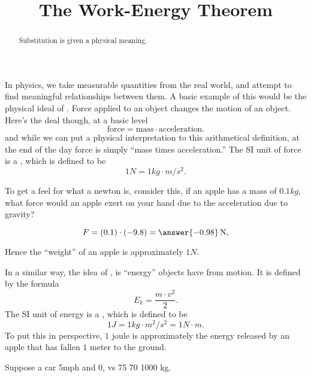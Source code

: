 \documentclass{ximera}
\title[Dig-In:]{The Work-Energy Theorem}
\begin{document}
\begin{abstract}
  Substitution is given a physical meaning. 
\end{abstract}
\maketitle

In physics, we take measurable quantities from the real world, and
attempt to find meaningful relationships between them. A basic example
of this would be the physical ideal of . Force applied to an
object changes the motion of an object. Here's the deal though, at a
basic level
\[
\mathrm{force} = \mathrm{mass} \cdot \mathrm{acceleration}.
\]
and while we can put a physical interpretation to this arithmetical
definition, at the end of the day force is simply ``mass times
acceleration.'' The SI unit of force is a , which is defined to be
\[
1\unit{N} = 1\unit{kg}\cdot \unit{m}/\unit{s}^2. 
\]
\begin{question}
  To get a feel for what a newton is, consider this, if an apple has a
  mass of $0.1\unit{kg}$, what force would an apple exert on your hand
  due to the acceleration due to gravity?
  \begin{prompt}
  \[
  F = (0.1) \cdot (-9.8) = \answer{-0.98}\unit{N},
  \]
  \end{prompt}
\begin{feedback}
  Hence the ``weight'' of an apple is approximately $1\unit{N}$.
\end{feedback}
\end{question}


In a similar way, the idea of , is ``energy''
objects have from motion. It is defined by the formula
\[
E_k = \frac{m \cdot v^2}{2}.
\]
The SI unit of energy is a , which is defined to be
\[
1\unit{J} = 1\unit{kg}\cdot \unit{m}^2/\unit{s}^2 = 1\unit{N}\cdot\unit{m}. 
\]
To put this in perspective, $1$ joule is approximately the energy
released by an apple that has fallen $1$ meter to the ground.
\begin{question}
  Suppose a car 5mph and 0, vs 75 70 1000 kg.
\end{question}
\end{document}
